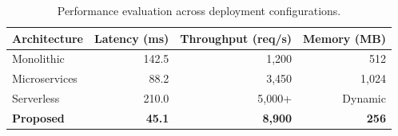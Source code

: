 \begin{table}[htbp]
    \centering
    \caption{Performance evaluation across deployment configurations.}
    \label{tab:performance-comparison}
    \begin{tabular}{lrrr}
        \toprule
        \textbf{Architecture} & \textbf{Latency (ms)} & \textbf{Throughput (req/s)} & \textbf{Memory (MB)} \\
        \midrule
        Monolithic            & 142.5                 & 1,200                       & 512                  \\
        Microservices         & 88.2                  & 3,450                       & 1,024                \\
        Serverless            & 210.0                 & 5,000+                      & Dynamic              \\
        \textbf{Proposed}     & \textbf{45.1}         & \textbf{8,900}              & \textbf{256}         \\
        \bottomrule
    \end{tabular}
\end{table}